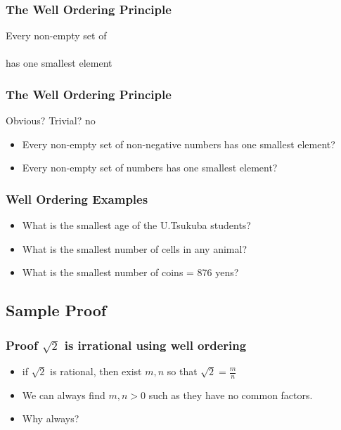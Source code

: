 \documentclass{beamer}
\begin{document}
\begin{frame}
  \frametitle{The Well Ordering Principle}

  {\Large
  \begin{center}
    Every non-empty set of\\
    \\
    has one \alert{smallest element}
  \end{center}}
\end{frame}

\begin{frame}
  \frametitle{The Well Ordering Principle}
  \begin{center}
    Obvious?  \hspace{2cm} Trivial? \alert{no}
  \end{center}
  \vfill

  \begin{itemize}
  \item Every non-empty set of non-negative 
    numbers has one smallest element?

    \bigskip

  \item Every non-empty set of  numbers has one
    smallest element?
  \end{itemize}
\end{frame}

\begin{frame}
  \frametitle{Well Ordering Examples}
  {\large
    \begin{itemize}
    \item What is the smallest age of the U.Tsukuba students?
    \item What is the smallest number of cells in any animal?
    \item What is the smallest number of coins = 876 yens?
    \end{itemize}
  }
\end{frame}

\subsection{Sample Proof}
\begin{frame}
  \frametitle{Proof $\sqrt{2}$ is irrational using well ordering}

  \begin{itemize}
    \item if $\sqrt{2}$ is rational, then exist $m,n$ so that
      $\sqrt{2} = \frac{m}{n}$
    \item We can always find $m,n > 0$ such as they have no common
      factors.
    \item \alert{Why} always?
  \end{itemize}
\end{frame}
\end{document}
